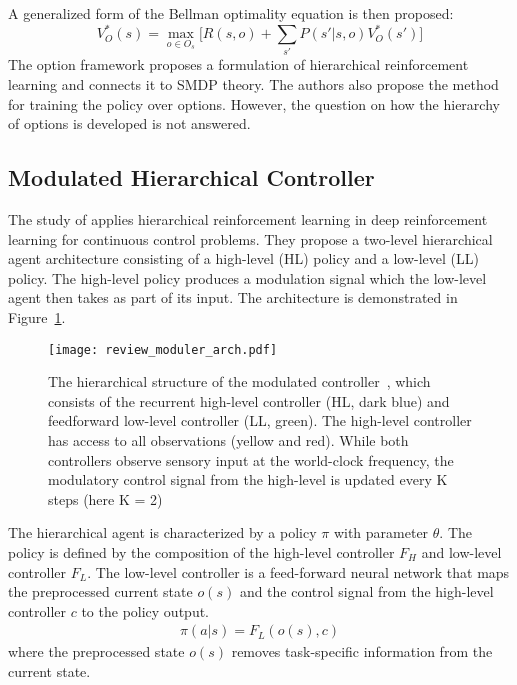 A generalized form of the Bellman optimality equation is then proposed:
\begin{equation}
    V_O^*(s) = \max_{o \in O_s} \big[ R(s,o)+\sum_{s'}P(s' \lvert s,o) V_O^*(s') \big]
\end{equation}
The option framework proposes a formulation of hierarchical reinforcement learning and connects it to SMDP theory. The authors also propose the method for training the policy over options. However, the question on how the hierarchy of options is developed is not answered.

\subsection{Modulated Hierarchical Controller}
The study of \cite{heess2016learning} applies hierarchical reinforcement learning in deep reinforcement learning for continuous control problems. They propose a two-level hierarchical agent architecture consisting of a high-level (HL) policy and a low-level (LL) policy. The high-level policy produces a modulation signal which the low-level agent then takes as part of its input. The architecture is demonstrated in Figure~\ref{review_moduler_arch}.
\begin{figure}[h]
	\texttt{[image: review\_moduler\_arch.pdf]}
	\centering
	\caption{The hierarchical structure of the modulated controller~\cite{heess2016learning}, which consists
		of the recurrent high-level controller (HL, dark blue) and
		feedforward low-level controller (LL, green).  The
		high-level controller has access to all observations (yellow and red). While both controllers observe sensory
		input at the world-clock frequency, the modulatory control signal from the high-level is updated every K
		steps (here K = 2)}\label{review_moduler_arch}
\end{figure}
The hierarchical agent is characterized by a policy $\pi$ with parameter $\theta$. The policy is defined by the composition of the high-level controller $F_H$ and low-level controller $F_L$. The low-level controller is a feed-forward neural network that maps the preprocessed current state $o(s)$ and the control signal from the high-level controller $c$ to the policy output.
\begin{align}
\pi (a| s) = F_L(o(s),c)
\end{align}
where the preprocessed state $o(s)$ removes task-specific information from the current state.
